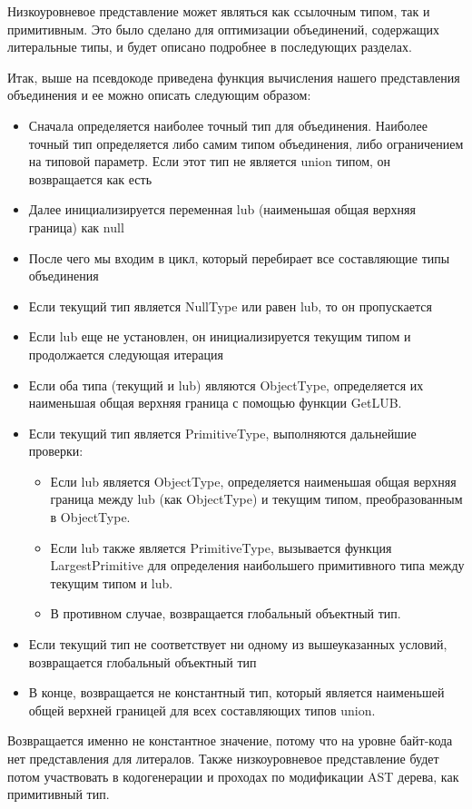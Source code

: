 Низкоуровневое представление может являться как ссылочным типом, так и примитивным.
Это было сделано для оптимизации объединений, содержащих литеральные типы, и будет описано подробнее в последующих
разделах.

Итак, выше на псевдокоде приведена функция вычисления нашего представления объединения и ее можно описать следующим
образом:
\begin{itemize}[left=2em]
    \item Сначала определяется наиболее точный тип для объединения.
    Наиболее точный тип определяется либо самим типом объединения, либо ограничением на типовой параметр.
    Если этот тип не является union типом, он возвращается как есть
    \item Далее инициализируется переменная lub (наименьшая общая верхняя граница) как null
    \item После чего мы входим в цикл, который перебирает все составляющие типы объединения
    \item Если текущий тип является NullType или равен lub, то он пропускается
    \item Если lub еще не установлен, он инициализируется текущим типом и продолжается следующая итерация
    \item Если оба типа (текущий и lub) являются ObjectType, определяется их наименьшая общая верхняя граница с
    помощью функции GetLUB\@.
    \item Если текущий тип является PrimitiveType, выполняются дальнейшие проверки:
    \begin{itemize}[left=2em]
        \item Если lub является ObjectType, определяется наименьшая общая верхняя граница между lub (как ObjectType) и
        текущим типом, преобразованным в ObjectType.
        \item Если lub также является PrimitiveType, вызывается функция LargestPrimitive для определения наибольшего
        примитивного типа между текущим типом и lub.
        \item В противном случае, возвращается глобальный объектный тип.
    \end{itemize}
    \item Если текущий тип не соответствует ни одному из вышеуказанных условий, возвращается глобальный объектный тип
    \item В конце, возвращается не константный тип, который является наименьшей общей верхней границей для всех
    составляющих типов union.
\end{itemize}
Возвращается именно не константное значение, потому что на уровне байт-кода нет представления для литералов.
Также низкоуровневое представление будет потом участвовать в кодогенерации и проходах по модификации AST дерева,
как примитивный тип.

